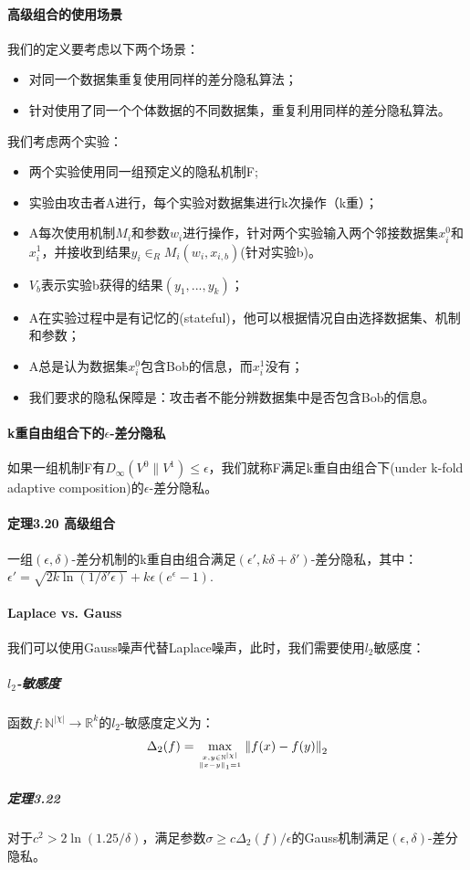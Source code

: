 \documentclass[12pt,a4paper]{article}
\begin{document}
\paragraph{高级组合的使用场景} 我们的定义要考虑以下两个场景：
\begin{itemize}
	\item 对同一个数据集重复使用同样的差分隐私算法；
	\item 针对使用了同一个个体数据的不同数据集，重复利用同样的差分隐私算法。
\end{itemize}
我们考虑两个实验：
\begin{itemize}
	\item 两个实验使用同一组预定义的隐私机制F;
	\item 实验由攻击者A进行，每个实验对数据集进行k次操作（k重）；
	\item A每次使用机制$M_i$和参数$w_i$进行操作，针对两个实验输入两个邻接数据集$x_i^0$和$x_i^1$，并接收到结果$y_i \in_R M_i(w_i,x_{i,b})$(针对实验b)。
	\item $V_b$表示实验b获得的结果$(y_1,...,y_k)$；
	\item A在实验过程中是有记忆的(stateful)，他可以根据情况自由选择数据集、机制和参数；
	\item A总是认为数据集$x_i^0$包含Bob的信息，而$x_i^1$没有；
	\item 我们要求的隐私保障是：攻击者不能分辨数据集中是否包含Bob的信息。
\end{itemize}
\paragraph{k重自由组合下的$\epsilon$-差分隐私} 如果一组机制F有$D_{\infty}(V^0\parallel V^1)\leq\epsilon$，我们就称F满足k重自由组合下(under k-fold adaptive composition)的$\epsilon$-差分隐私。
\paragraph{定理3.20 高级组合} 一组$(\epsilon, \delta)$-差分机制的k重自由组合满足$({\epsilon}', k\delta+{\delta}')$-差分隐私，其中： ${\epsilon}'=\sqrt{2k\ln(1/{\delta}'\epsilon)} + k\epsilon(e^\epsilon-1)$.
\paragraph{Laplace vs. Gauss} 我们可以使用Gauss噪声代替Laplace噪声，此时，我们需要使用$l_2$敏感度：
\subparagraph{$l_2$-敏感度} 函数$f: \mathbb{N}^{|\chi|} \rightarrow \mathbb{R}^k$的$l_2$-敏感度定义为：
\begin{equation}
	\Delta_2(f)=\max_{x,y \in \mathbb{N}^{|\chi|} \atop \left \| x-y \right \|_1=1} \left \| f(x)-f(y) \right \|_2
\end{equation}
\subparagraph{定理3.22} 对于$c^2 > 2\ln(1.25/\delta)$，满足参数$\sigma \geq c\Delta_2(f)/\epsilon$的Gauss机制满足$(\epsilon, \delta)$-差分隐私。
\end{document}
